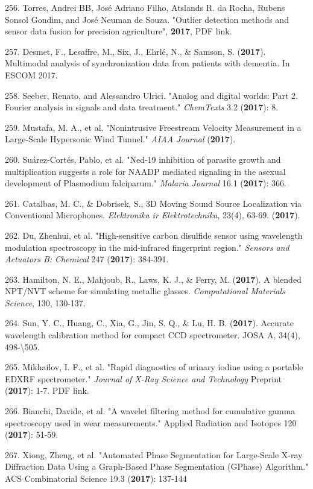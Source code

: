 256. Torres, Andrei BB, Jos\'{e} Adriano Filho, Atslands R. da Rocha, Rubens Sonsol Gondim, and Jos\'{e} Neuman de Souza. "Outlier detection methods and sensor data fusion for precision agriculture", \textbf{2017}, PDF link.

257. Desmet, F., Lesaffre, M., Six, J., Ehrl\'{e}, N., \& Samson, S. (\textbf{2017}). Multimodal analysis of synchronization data from patients with dementia. In ESCOM 2017.

258. Seeber, Renato, and Alessandro Ulrici. "Analog and digital worlds: Part 2. Fourier analysis in signals and data treatment." \textit{ChemTexts} 3.2 (\textbf{2017}): 8.

259. Mustafa, M. A., et al. "Nonintrusive Freestream Velocity Measurement in a Large-Scale Hypersonic Wind Tunnel." \textit{AIAA Journal} (\textbf{2017}).

260. Su\'{a}rez-Cort\'{e}s, Pablo, et al. "Ned-19 inhibition of parasite growth and multiplication suggests a role for NAADP mediated signaling in the asexual development of Plasmodium falciparum." \textit{Malaria Journal} 16.1 (\textbf{2017}): 366.

261. Catalbas, M. C., \& Dobrisek, S., 3D Moving Sound Source Localization via Conventional Microphones. \textit{Elektronika ir Elektrotechnika}, 23(4), 63-69. (\textbf{2017}).

262. Du, Zhenhui, et al. "High-sensitive carbon disulfide sensor using wavelength modulation spectroscopy in the mid-infrared fingerprint region." \textit{Sensors and Actuators B: Chemical} 247 (\textbf{2017}): 384-391.

263. Hamilton, N. E., Mahjoub, R., Laws, K. J., \& Ferry, M. (\textbf{2017}). A blended NPT/NVT scheme for simulating metallic glasses. \textit{Computational Materials Science}, 130, 130-137.

264. Sun, Y. C., Huang, C., Xia, G., Jin, S. Q., \& Lu, H. B. (\textbf{2017}). Accurate wavelength calibration method for compact CCD spectrometer. JOSA A, 34(4), 498-\textbackslash 505.

265. Mikhailov, I. F., et al. "Rapid diagnostics of urinary iodine using a portable EDXRF spectrometer." \textit{Journal of X-Ray Science and Technology} Preprint (\textbf{2017}): 1-7. PDF link.

266. Bianchi, Davide, et al. "A wavelet filtering method for cumulative gamma spectroscopy used in wear measurements." Applied Radiation and Isotopes 120 (\textbf{2017}): 51-59.

267. Xiong, Zheng, et al. "Automated Phase Segmentation for Large-Scale X-ray Diffraction Data Using a Graph-Based Phase Segmentation (GPhase) Algorithm." ACS Combinatorial Science 19.3 (\textbf{2017}): 137-144


